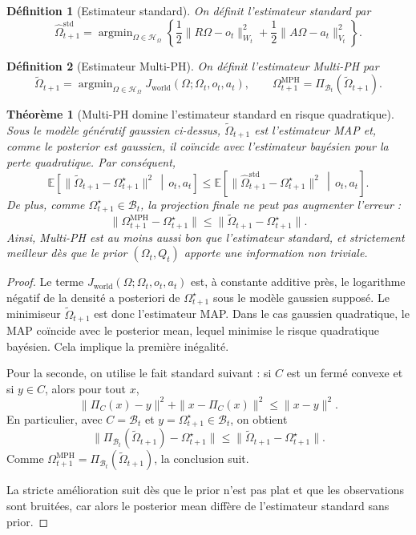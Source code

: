\documentclass[11pt,a4paper]{article}
\newtheorem{definition}{Définition}[section]
\newtheorem{theorem}{Théorème}[section]
\DeclareMathOperator{\argmin}{argmin}
\newcommand{\Hh}{\mathcal H}
\newcommand{\1}{\mathbf 1}
\begin{document}
\begin{definition}[Estimateur standard]
On définit l'estimateur standard par
\[
\hat\Omega_{t+1}^{\mathrm{std}}
=
\argmin_{\Omega\in\Hh_\Omega}
\left\{
\frac12\|R\Omega-o_t\|_{W_t}^2
+
\frac12\|A\Omega-a_t\|_{V_t}^2
\right\}.
\]
\end{definition}

\begin{definition}[Estimateur Multi-PH]
On définit l'estimateur Multi-PH par
\[
\tilde\Omega_{t+1}
=
\argmin_{\Omega\in\Hh_\Omega}
J_{\mathrm{world}}(\Omega;\Omega_t,o_t,a_t),
\qquad
\Omega_{t+1}^{\mathrm{MPH}}
=
\Pi_{\mathcal B_t}(\tilde\Omega_{t+1}).
\]
\end{definition}

\begin{theorem}[Multi-PH domine l'estimateur standard en risque quadratique]
Sous le modèle génératif gaussien ci-dessus, \(\tilde\Omega_{t+1}\) est l'estimateur MAP et, comme le posterior est gaussien, il coïncide avec l'estimateur bayésien pour la perte quadratique.
Par conséquent,
\[
\mathbb E\!\left[\|\tilde\Omega_{t+1}-\Omega_{t+1}^\star\|^2 \,\middle|\, o_t,a_t\right]
\le
\mathbb E\!\left[\|\hat\Omega_{t+1}^{\mathrm{std}}-\Omega_{t+1}^\star\|^2 \,\middle|\, o_t,a_t\right].
\]
De plus, comme \(\Omega_{t+1}^\star\in\mathcal B_t\), la projection finale ne peut pas augmenter l'erreur :
\[
\|\Omega_{t+1}^{\mathrm{MPH}}-\Omega_{t+1}^\star\|
\le
\|\tilde\Omega_{t+1}-\Omega_{t+1}^\star\|.
\]
Ainsi, Multi-PH est au moins aussi bon que l'estimateur standard, et strictement meilleur dès que le prior \((\Omega_t,Q_t)\) apporte une information non triviale.
\end{theorem}

\begin{proof}
Le terme \(J_{\mathrm{world}}(\Omega;\Omega_t,o_t,a_t)\) est, à constante additive près, le logarithme négatif de la densité a posteriori de \(\Omega_{t+1}^\star\) sous le modèle gaussien supposé.
Le minimiseur \(\tilde\Omega_{t+1}\) est donc l'estimateur MAP.  
Dans le cas gaussien quadratique, le MAP coïncide avec le posterior mean, lequel minimise le risque quadratique bayésien.
Cela implique la première inégalité.

Pour la seconde, on utilise le fait standard suivant :
si \(C\) est un fermé convexe et si \(y\in C\), alors pour tout \(x\),
\[
\|\Pi_C(x)-y\|^2+\|x-\Pi_C(x)\|^2\le \|x-y\|^2.
\]
En particulier, avec \(C=\mathcal B_t\) et \(y=\Omega_{t+1}^\star\in\mathcal B_t\), on obtient
\[
\|\Pi_{\mathcal B_t}(\tilde\Omega_{t+1})-\Omega_{t+1}^\star\|
\le
\|\tilde\Omega_{t+1}-\Omega_{t+1}^\star\|.
\]
Comme \(\Omega_{t+1}^{\mathrm{MPH}}=\Pi_{\mathcal B_t}(\tilde\Omega_{t+1})\), la conclusion suit.

La stricte amélioration suit dès que le prior n'est pas plat et que les observations sont bruitées, car alors le posterior mean diffère de l'estimateur standard sans prior.
\end{proof}
\end{document}
